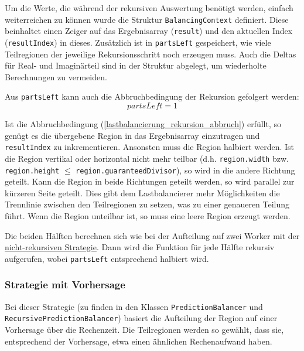 Um die Werte, die während der rekursiven Auswertung benötigt werden, einfach weiterreichen zu können wurde die Struktur \verb|BalancingContext| definiert.
Diese beinhaltet einen Zeiger auf das Ergebnisarray (\verb|result|) und den aktuellen Index (\verb|resultIndex|) in dieses.
Zusätzlich ist in \verb|partsLeft| gespeichert, wie viele Teilregionen der jeweilige Rekursionsschritt noch erzeugen muss.
Auch die Deltas für Real- und Imaginärteil sind in der Struktur abgelegt, um wiederholte Berechnungen zu vermeiden.

Aus \verb|partsLeft| kann auch die Abbruchbedingung der Rekursion gefolgert werden:
\begin{equation}\label{lastbalancierung_rekursion_abbruch}
	partsLeft = 1
\end{equation}

Ist die Abbruchbedingung (\ref{lastbalancierung_rekursion_abbruch}) erfüllt, so genügt es die übergebene Region in das Ergebnisarray einzutragen und \verb|resultIndex| zu inkrementieren.
Ansonsten muss die Region halbiert werden. Ist die Region vertikal oder horizontal nicht mehr teilbar (d.h. \verb|region.width| bzw. \verb|region.height| $\leq$ \verb|region.guaranteedDivisor|), so wird in die andere Richtung geteilt.
Kann die Region in beide Richtungen geteilt werden, so wird parallel zur kürzeren Seite geteilt.
Dies gibt dem Lastbalancierer mehr Möglichkeiten die Trennlinie zwischen den Teilregionen zu setzen, was zu einer genaueren Teilung führt.
Wenn die Region unteilbar ist, so muss eine leere Region erzeugt werden.

Die beiden Hälften berechnen sich wie bei der Aufteilung auf zwei Worker mit der \hyperref[lastbalancierung_naiv]{nicht-rekursiven Strategie}.
Dann wird die Funktion für jede Hälfte rekursiv aufgerufen, wobei \verb|partsLeft| entsprechend halbiert wird.

\subsubsection{Strategie mit Vorhersage}

Bei dieser Strategie (zu finden in den Klassen \verb|PredictionBalancer| und \\ \verb|RecursivePredictionBalancer|) basiert die Aufteilung der Region auf einer Vorhersage über die Rechenzeit.
Die Teilregionen werden so gewählt, dass sie, entsprechend der Vorhersage, etwa einen ähnlichen Rechenaufwand haben.

